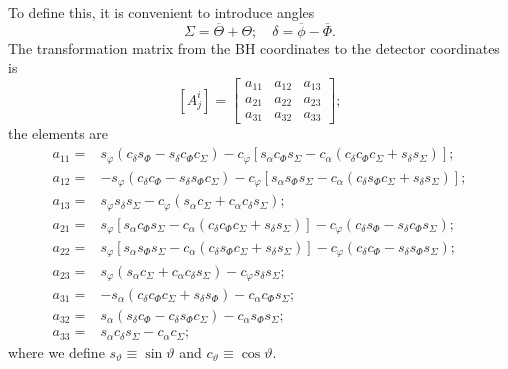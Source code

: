 To define this, it is convenient to introduce angles
\begin{equation}
\Sigma = \overline{\Theta} + \Theta; \quad \delta = \overline{\phi} - \overline{\Phi}.
\end{equation}
The transformation matrix from the BH coordinates to the detector coordinates is
\begin{equation}
\left[A^i_j\right] = \begin{bmatrix}
a_{11} & a_{12} & a_{13} \\
a_{21} & a_{22} & a_{23} \\
a_{31} & a_{32} & a_{33}
\end{bmatrix};
\end{equation}
the elements are
\begin{align}
a_{11} = {} & s_\varphi\left(c_\delta s_\Phi - s_\delta c_\Phi c_\Sigma\right) - c_\varphi \left[s_\alpha c_\Phi s_\Sigma - c_\alpha \left(c_\delta c_\Phi c_\Sigma + s_\delta s_\Sigma\right)\right]; \\
a_{12} = {} & -s_\varphi\left(c_\delta c_\Phi - s_\delta s_\Phi c_\Sigma\right) - c_\varphi \left[s_\alpha s_\Phi s_\Sigma - c_\alpha \left(c_\delta s_\Phi c_\Sigma + s_\delta s_\Sigma\right)\right]; \\
a_{13} = {} & s_\varphi s_\delta s_\Sigma - c_\varphi\left(s_\alpha c_\Sigma + c_\alpha c_\delta s_\Sigma\right); \\
a_{21} = {} & s_\varphi\left[s_\alpha c_\Phi s_\Sigma - c_\alpha \left(c_\delta c_\Phi c_\Sigma + s_\delta s_\Sigma\right)\right] - c_\varphi \left(c_\delta s_\Phi - s_\delta c_\Phi s_\Sigma\right); \\
a_{22} = {} & s_\varphi\left[s_\alpha s_\Phi s_\Sigma - c_\alpha \left(c_\delta s_\Phi c_\Sigma + s_\delta s_\Sigma\right)\right] - c_\varphi \left(c_\delta c_\Phi - s_\delta s_\Phi s_\Sigma\right); \\
a_{23} = {} & s_\varphi\left(s_\alpha c_\Sigma + c_\alpha c_\delta s_\Sigma\right) - c_\varphi s_\delta s_\Sigma; \\
a_{31} = {} & -s_\alpha\left(c_\delta c_\Phi c_\Sigma + s_\delta s_\Phi\right) - c_\alpha c_\Phi s_\Sigma; \\
a_{32} = {} & s_\alpha\left(s_\delta c_\Phi - c_\delta s_\Phi c_\Sigma\right) - c_\alpha s_\Phi s_\Sigma; \\
a_{33} = {} & s_\alpha c_\delta s_\Sigma - c_\alpha c_\Sigma;
\end{align}
where we define $s_\vartheta \equiv \sin \vartheta$ and $c_\vartheta \equiv \cos \vartheta$.

